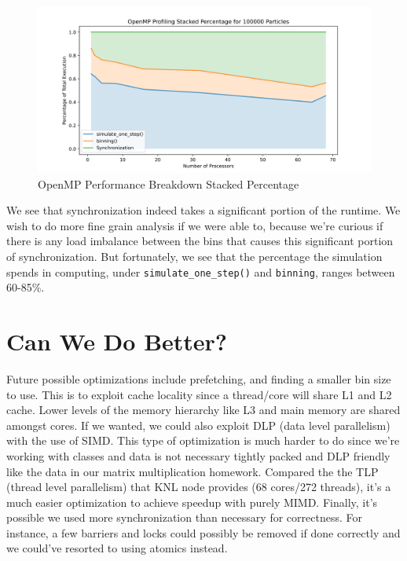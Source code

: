 \documentclass{article}
\begin{document}
\begin{figure}[H]
\centering
\includegraphics[width=6in]{figures/openmp_profiling_stacked_percentage.png}
\caption{OpenMP Performance Breakdown Stacked Percentage}
\label{fig:openmp-profile-stacked-percentage}
\end{figure}

We see that synchronization indeed takes a significant portion of the runtime. We wish to do more fine grain analysis if we were able to, because we're curious if there is any load imbalance between the bins that causes this significant portion of synchronization. But fortunately, we see that the percentage the simulation spends in computing, under \verb|simulate_one_step()| and \verb|binning|, ranges between 60-85\%. 

\section{Can We Do Better?}
Future possible optimizations include prefetching, and finding a smaller bin size to use. This is to exploit cache locality since a thread/core will share L1 and L2 cache. Lower levels of the memory hierarchy like L3 and main memory are shared amongst cores. If we wanted, we could also exploit DLP (data level parallelism) with the use of SIMD. This type of optimization is much harder to do since we're working with classes and data is not necessary tightly packed and DLP friendly like the data in our matrix multiplication homework. Compared the the TLP (thread level parallelism) that KNL node provides (68 cores/272 threads), it's a much easier optimization to achieve speedup with purely MIMD. Finally, it's possible we used more synchronization than necessary for correctness. For instance, a few barriers and locks could possibly be removed if done correctly and we could've resorted to using atomics instead. 
\end{document}
